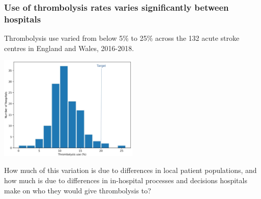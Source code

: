 \begin{frame}
\frametitle{Use of thrombolysis rates varies significantly between hospitals}

\small
Thrombolysis use varied from below 5\% to 25\% across the 132 acute stroke centres in England and Wales, 2016-2018.
\begin{center}
\includegraphics[width=0.50\textwidth]{./images/thrombolysis_by_hospital}
\end{center}

How much of this variation is due to differences in local patient populations, and how much is due to differences in in-hospital processes and decisions hospitals make on who they would give thrombolysis to?
\end{frame}